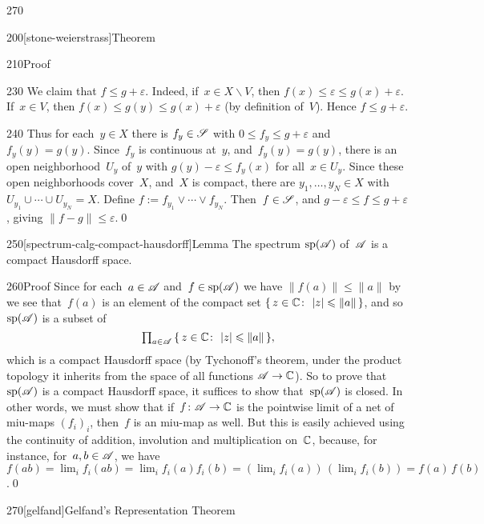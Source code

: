 \begin{parsec}{270}
\begin{point}{200}[stone-weierstrass]{Theorem}
\begin{point}{210}{Proof}
\begin{point}{230}
We claim that $f\leq g+\varepsilon$.
Indeed,
if~$x\in X\backslash V$,
then $f(x)\leq \varepsilon\leq g(x)+\varepsilon$.
If~$x\in V$,
then $f(x)\leq g(y)\leq g(x)+\varepsilon$
(by definition of~$V$).
Hence $f\leq g+\varepsilon$.
\end{point}
\begin{point}{240}%
Thus for each~$y\in X$
there is $f_y\in \mathscr{S}$ with $0\leq f_y \leq g+\varepsilon$
and~$f_y(y)=g(y)$.
Since~$f_y$ is continuous at~$y$,
and~$f_y(y)=g(y)$,
there is an open neighborhood~$U_y$ of~$y$
with $g(y)-\varepsilon\leq f_y(x)$
for all~$x\in U_y$.
Since these open neighborhoods cover~$X$,
and~$X$ is compact,
there are $y_1,\dotsc,y_N\in X$
with $U_{y_1}\cup\dotsb\cup U_{y_N} = X$.
Define $f:=f_{y_1}\vee \dotsb\vee f_{y_N}$.
Then~$f\in\mathscr{S}$,
and $g-\varepsilon \leq f\leq g+\varepsilon$,
giving $\|f-g\|\leq \varepsilon$.\qed
\end{point}
\end{point}
\end{point}
\begin{point}{250}[spectrum-calg-compact-hausdorff]{Lemma}%
The spectrum $\mathrm{sp}(\mathscr{A})$ of~$\mathscr{A}$ is a compact Hausdorff space.
\begin{point}{260}{Proof}%
Since for each~$a\in \mathscr{A}$
and~$f\in \mathrm{sp}(\mathscr{A})$
we have  $\|f(a)\|\leq \|a\|$ 
by~
we see that~$f(a)$ is an element of the compact set
$\{\,z\in \mathbb{C}\colon\, \left|z\right|\leqslant\|a\|\,\}$,
and so~$\mathrm{sp}(\mathscr{A})$ is a subset of
\begin{equation*}
\textstyle
\prod_{a\in \mathscr{A}}\, \{\,z\in \mathbb{C}\colon\, \left|z\right|\leqslant \|a\|\,\},
\end{equation*}
which is a compact Hausdorff space
(by Tychonoff's theorem, under the product topology
it inherits
from the space of all functions $\mathscr{A}\to \mathbb{C}$).
So to prove that~$\mathrm{sp}(\mathscr{A})$
is a compact Hausdorff space,
it suffices to show that~$\mathrm{sp}(\mathscr{A})$
is closed.
In other words,
we must show that if~$f\colon \mathscr{A}\to \mathbb{C}$
is the pointwise limit of a net of miu-maps $(f_i)_i$,
then~$f$ is an miu-map as well.
But this is easily achieved
using the continuity of addition, involution and multiplication on~$\mathbb{C}$,
because, for instance, 
for~$a,b\in\mathscr{A}$, we have $f(ab)
= \lim_i f_i(ab)=\lim_i f_i(a)f_i(b)
 = (\lim_i f_i(a))\,(\lim_i f_i(b))
= f(a) \,f(b)$.\qed
\end{point}
\end{point}
\begin{point}{270}[gelfand]{Gelfand's Representation Theorem}%
%

\end{point}
\end{parsec}
